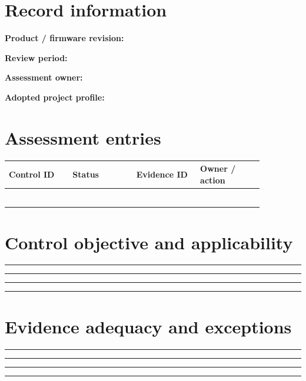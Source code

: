 \documentclass[10pt,letterpaper]{article}
\begin{document}
\makedoctitle
\makedocsummary
\section{Record information}
\noindent\textbf{Product / firmware revision:}\quad\hrulefill\par\vspace{11pt}
\noindent\textbf{Review period:}\quad\hrulefill\par\vspace{11pt}
\noindent\textbf{Assessment owner:}\quad\hrulefill\par\vspace{11pt}
\noindent\textbf{Adopted project profile:}\quad\hrulefill\par\vspace{11pt}
\section{Assessment entries}
\begin{longtable}{|p{0.215\linewidth}|p{0.215\linewidth}|p{0.215\linewidth}|p{0.215\linewidth}|}
\hline
\textbf{Control ID} & \textbf{Status} & \textbf{Evidence ID} & \textbf{Owner / action}\\\hline
\endhead
\rule{0pt}{27pt} & & & \\\hline
\rule{0pt}{27pt} & & & \\\hline
\rule{0pt}{27pt} & & & \\\hline
\rule{0pt}{27pt} & & & \\\hline
\rule{0pt}{27pt} & & & \\\hline
\rule{0pt}{27pt} & & & \\\hline
\end{longtable}
\section{Control objective and applicability}
\noindent\rule{\linewidth}{0.4pt}\par\vspace{16pt}
\noindent\rule{\linewidth}{0.4pt}\par\vspace{16pt}
\noindent\rule{\linewidth}{0.4pt}\par\vspace{16pt}
\noindent\rule{\linewidth}{0.4pt}\par\vspace{16pt}
\section{Evidence adequacy and exceptions}
\noindent\rule{\linewidth}{0.4pt}\par\vspace{16pt}
\noindent\rule{\linewidth}{0.4pt}\par\vspace{16pt}
\noindent\rule{\linewidth}{0.4pt}\par\vspace{16pt}
\noindent\rule{\linewidth}{0.4pt}\par\vspace{16pt}
\end{document}
